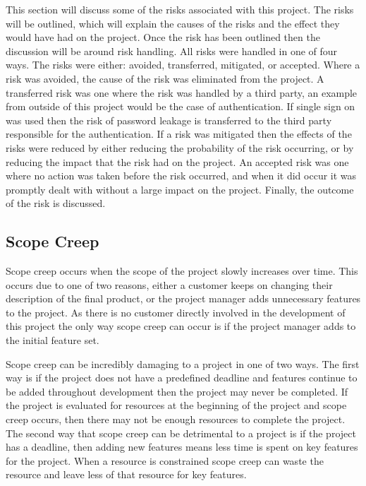 \documentclass{article}
\begin{document}
This section will discuss some of the risks associated with this project. The risks will be outlined, which will explain the causes of the risks and the effect they would have had on the project. Once the risk has been outlined then the discussion will be around risk handling. All risks were handled in one of four ways. The risks were either: avoided, transferred, mitigated, or accepted. Where a risk was avoided, the cause of the risk was eliminated from the project. A transferred risk was one where the risk was handled by a third party, an example from outside of this project would be the case of authentication. If single sign on was used then the risk of password leakage is transferred to the third party responsible for the authentication. If a risk was mitigated then the effects of the risks were reduced by either reducing the probability of the risk occurring, or by reducing the impact that the risk had on the project. An accepted risk was one where no action was taken before the risk occurred, and when it did occur it was promptly dealt with without a large impact on the project. Finally, the outcome of the risk is discussed. \par

\subsection{Scope Creep}

Scope creep occurs when the scope of the project slowly increases over time. This occurs due to one of two reasons, either a customer keeps on changing their description of the final product, or the project manager adds unnecessary features to the project. As there is no customer directly involved in the development of this project the only way scope creep can occur is if the project manager adds to the initial feature set. \par

Scope creep can be incredibly damaging to a project in one of two ways. The first way is if the project does not have a predefined deadline and features continue to be added throughout development then the project may never be completed. If the project is evaluated for resources at the beginning of the project and scope creep occurs, then there may not be enough resources to complete the project. The second way that scope creep can be detrimental to a project is if the project has a deadline, then adding new features means less time is spent on key features for the project. When a resource is constrained scope creep can waste the resource and leave less of that resource for key features. \par
\end{document}
